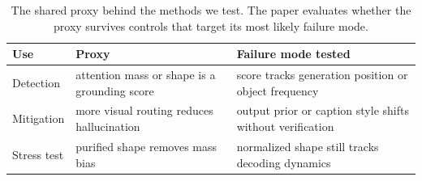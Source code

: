 \begin{table}[t]
\centering
\scriptsize
\setlength{\tabcolsep}{3.0pt}
\begin{tabular}{p{}p{}p{}}
\toprule
Use & Proxy & Failure mode tested \\
\midrule
Detection & attention mass or shape is a grounding score & score tracks generation position or object frequency \\
Mitigation & more visual routing reduces hallucination & output prior or caption style shifts without verification \\
Stress test & purified shape removes mass bias & normalized shape still tracks decoding dynamics \\
\bottomrule
\end{tabular}
\caption{The shared proxy behind the methods we test. The paper evaluates whether the proxy survives controls that target its most likely failure mode.}
\label{tab:proxy}
\end{table}
